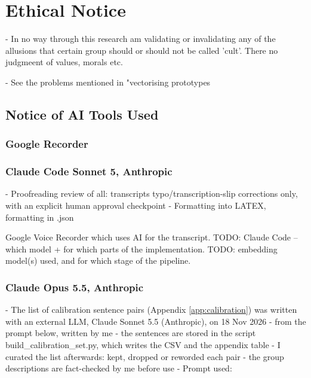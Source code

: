 \chapter{Ethical Notice}\label{ch:ethical_notice}

- In no way through this research am validating or invalidating any of the allusions that certain group should or should not be called 'cult'. There no judgmeent of values, morals etc.

- See the problems mentioned in "vectorising prototypes
\section{Notice of AI Tools Used}
\label{sec:ai_notice}

\subsection{Google Recorder}\autocite{google_recorder_2026}
\subsection{Claude Code Sonnet 5, Anthropic}\autocite{anthropic_2026}
- Proofreading review of all: transcripts typo/transcription-slip corrections only, with an explicit human approval checkpoint
- Formatting into LATEX, formatting in .json

Google Voice Recorder which uses AI for the transcript.
TODO: Claude Code -- which model + for which parts of the implementation.
TODO: embedding model(s) used, and for which stage of the pipeline.

\subsection{Claude Opus 5.5, Anthropic}\autocite{anthropic_2026}
\label{sec:ai_notice_calibration}
- The list of calibration sentence pairs (Appendix \ref{app:calibration}) was written with an external LLM, Claude Sonnet 5.5 (Anthropic), on 18 Nov 2026
- from the prompt below, written by me
- the sentences are stored in the script build\_calibration\_set.py, which writes the CSV and the appendix table
- I curated the list afterwards: kept, dropped or reworded each pair
- the group descriptions are fact-checked by me before use
- Prompt used:

